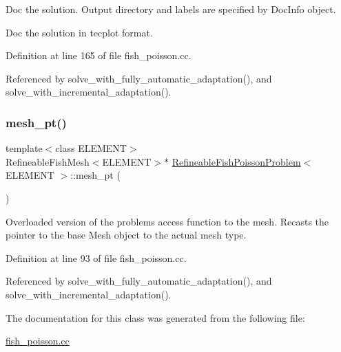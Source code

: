 Doc the solution. Output directory and labels are specified by Doc\+Info object. 

Doc the solution in tecplot format. 

Definition at line 165 of file fish\+\_\+poisson.\+cc.



Referenced by solve\+\_\+with\+\_\+fully\+\_\+automatic\+\_\+adaptation(), and solve\+\_\+with\+\_\+incremental\+\_\+adaptation().

\mbox{\label{classRefineableFishPoissonProblem_a803c9050b07b35aba22f08a5a9e59f2c}} 
\subsubsection{\texorpdfstring{mesh\+\_\+pt()}{mesh\_pt()}}
{\footnotesize\ttfamily template$<$class E\+L\+E\+M\+E\+NT$>$ \\
Refineable\+Fish\+Mesh$<$E\+L\+E\+M\+E\+NT$>$$\ast$ \hyperlink{classRefineableFishPoissonProblem}{Refineable\+Fish\+Poisson\+Problem}$<$ E\+L\+E\+M\+E\+NT $>$\+::mesh\+\_\+pt (\begin{DoxyParamCaption}{ }\end{DoxyParamCaption})\hspace{0.3cm}{\ttfamily [inline]}}



Overloaded version of the problem\textquotesingle{}s access function to the mesh. Recasts the pointer to the base Mesh object to the actual mesh type. 



Definition at line 93 of file fish\+\_\+poisson.\+cc.



Referenced by solve\+\_\+with\+\_\+fully\+\_\+automatic\+\_\+adaptation(), and solve\+\_\+with\+\_\+incremental\+\_\+adaptation().



The documentation for this class was generated from the following file\+:\begin{DoxyCompactItemize}
\item 
\hyperlink{fish__poisson_8cc}{fish\+\_\+poisson.\+cc}\end{DoxyCompactItemize}
